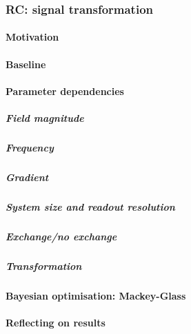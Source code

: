\subsubsection{RC: signal transformation}
\paragraph{Motivation} %
\paragraph{Baseline}
\paragraph{Parameter dependencies}
\subparagraph{Field magnitude}
\subparagraph{Frequency}
\subparagraph{Gradient}
\subparagraph{System size and readout resolution}
\subparagraph{Exchange/no exchange}
\subparagraph{Transformation}
\paragraph{Bayesian optimisation: Mackey-Glass}
\paragraph{Reflecting on results} %
